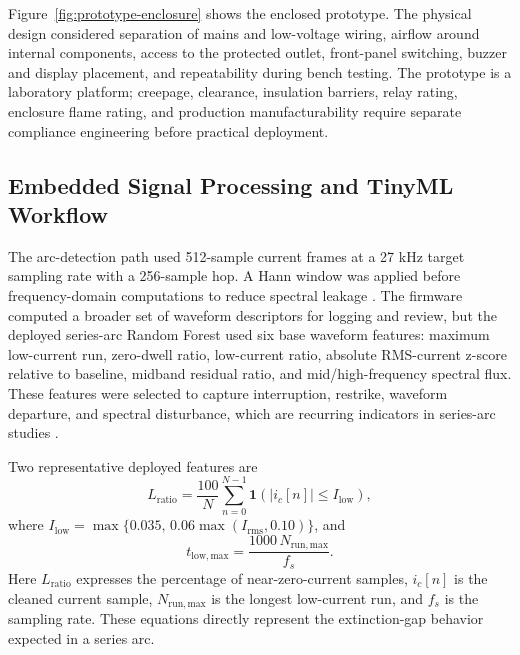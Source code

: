 \documentclass[twocolumn,twoside]{base/ajstd}
\begin{document}
Figure~\ref{fig:prototype-enclosure} shows the enclosed prototype. The physical design considered separation of mains and low-voltage wiring, airflow around internal components, access to the protected outlet, front-panel switching, buzzer and display placement, and repeatability during bench testing. The prototype is a laboratory platform; creepage, clearance, insulation barriers, relay rating, enclosure flame rating, and production manufacturability require separate compliance engineering before practical deployment.

\subsection{Embedded Signal Processing and TinyML Workflow}

The arc-detection path used 512-sample current frames at a 27 kHz target sampling rate with a 256-sample hop. A Hann window was applied before frequency-domain computations to reduce spectral leakage \citep{Harris1978Windows}. The firmware computed a broader set of waveform descriptors for logging and review, but the deployed series-arc Random Forest used six base waveform features: maximum low-current run, zero-dwell ratio, low-current ratio, absolute RMS-current z-score relative to baseline, midband residual ratio, and mid/high-frequency spectral flux. These features were selected to capture interruption, restrike, waveform departure, and spectral disturbance, which are recurring indicators in series-arc studies \citep{Zhao2022SeriesArc,Gong2022SeriesArc,Chen2024LightweightArc,Qi2024SeriesArcELM}.

Two representative deployed features are
\begin{equation}
  L_{\mathrm{ratio}}=\frac{100}{N}\sum_{n=0}^{N-1}\mathbf{1}\!\left(|i_c[n]|\le I_{\mathrm{low}}\right),
  \label{eq:low-current-ratio}
\end{equation}
where $I_{\mathrm{low}}=\max\{0.035,\,0.06\max(I_{\mathrm{rms}},0.10)\}$, and
\begin{equation}
  t_{\mathrm{low,max}}=\frac{1000\,N_{\mathrm{run,max}}}{f_s}.
  \label{eq:max-low-run}
\end{equation}
Here $L_{\mathrm{ratio}}$ expresses the percentage of near-zero-current samples, $i_c[n]$ is the cleaned current sample, $N_{\mathrm{run,max}}$ is the longest low-current run, and $f_s$ is the sampling rate. These equations directly represent the extinction-gap behavior expected in a series arc.
\end{document}
